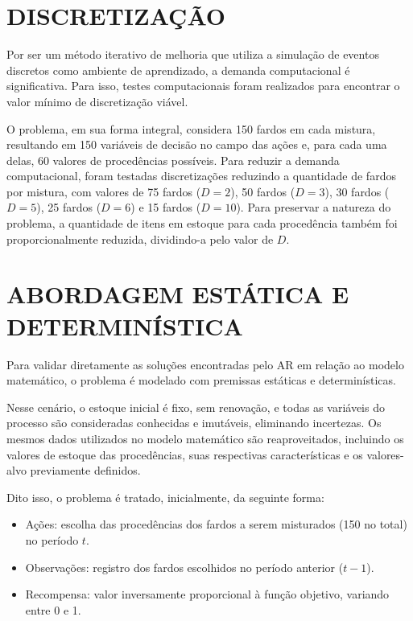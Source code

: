 \documentclass[
    12pt,                %
    openright,           %
    oneside,             %
    a4paper,             %
    english,             %
    spanish,             %
    brazil               %
]{ufscar}
\begin{document}
\section{DISCRETIZAÇÃO}

Por ser um método iterativo de melhoria que utiliza a simulação de eventos discretos como ambiente de aprendizado, a demanda computacional é significativa. Para isso, testes computacionais foram realizados para encontrar o valor mínimo de discretização viável. 

O problema, em sua forma integral, considera 150 fardos em cada mistura, resultando em 150 variáveis de decisão no campo das ações e, para cada uma delas, 60 valores de procedências possíveis. Para reduzir a demanda computacional, foram testadas discretizações reduzindo a quantidade de fardos por mistura, com valores de 75 fardos (\(D=2\)), 50 fardos (\(D=3\)), 30 fardos (\(D=5\)), 25 fardos (\(D=6\)) e 15 fardos (\(D=10\)). Para preservar a natureza do problema, a quantidade de itens em estoque para cada procedência também foi proporcionalmente reduzida, dividindo-a pelo valor de \(D\).


\section{ABORDAGEM ESTÁTICA E DETERMINÍSTICA}

Para validar diretamente as soluções encontradas pelo AR em relação ao modelo matemático, o problema é modelado com premissas estáticas e determinísticas.

Nesse cenário, o estoque inicial é fixo, sem renovação, e todas as variáveis do processo são consideradas conhecidas e imutáveis, eliminando incertezas. Os mesmos dados utilizados no modelo matemático são reaproveitados, incluindo os valores de estoque das procedências, suas respectivas características e os valores-alvo previamente definidos.

Dito isso, o problema é tratado, inicialmente, da seguinte forma:
\begin{itemize}
    \item Ações: escolha das procedências dos fardos a serem misturados (150 no total) no período $t$.
    \item Observações: registro dos fardos escolhidos no período anterior ($t-1$).
    \item Recompensa: valor inversamente proporcional à função objetivo, variando entre 0 e 1.
\end{itemize}
\end{document}

